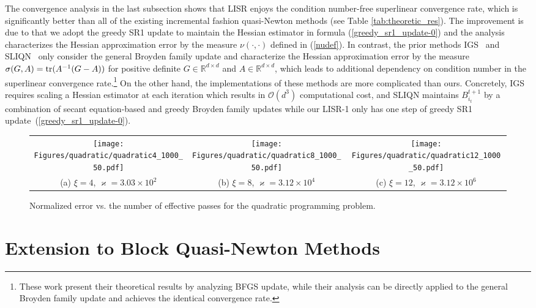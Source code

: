 \documentclass[letterpaper]{article} %
\theoremstyle{plain}
\theoremstyle{definition}
\theoremstyle{remark}
\def\BR{{\mathbb{R}}}
\def\fO{{\mathcal{O}}}
\begin{document}
The convergence analysis in the last subsection shows that LISR enjoys the condition number-free superlinear convergence rate, which is significantly better than all of the existing incremental fashion quasi-Newton methods (see Table \ref{tab:theoretic_res}).
The improvement is due to that we adopt the greedy SR1 update to maintain the Hessian estimator in formula (\ref{greedy_sr1_update-0}) and the analysis characterizes the Hessian approximation error by the measure $\nu(\cdot,\cdot)$ defined in (\ref{nudef}).
In contrast, the prior methods IGS~\cite{gao2020incremental} and SLIQN~\cite{lahoti2023sharpened} only consider the general Broyden family update and characterize the Hessian approximation error by the measure
$\sigma(G, A) = {\rm tr}(A^{-1}(G - A))$ for positive definite $G\in\BR^{d\times d}$ and $A\in\BR^{d\times d}$, which leads to additional dependency on condition number in the superlinear convergence rate.\footnote{These work present their theoretical results by analyzing BFGS update, while their analysis can be directly applied to the general Broyden family update and achieves the identical convergence rate.} 
On the other hand, the implementations of these methods are more complicated than ours. 
Concretely, IGS requires scaling a Hessian estimator at each iteration which results in $\fO(d^3)$ computational cost, and
SLIQN maintains $B_{i_t}^{t+1}$ by a combination of secant equation-based and greedy Broyden family updates while our LISR-1 only has one step of greedy SR1 update~(\ref{greedy_sr1_update-0}).

\begin{figure*}[!tb]
\centering
\begin{tabular}{ccc}
     \texttt{[image: Figures/quadratic/quadratic4\_1000\_50.pdf]}
     & \texttt{[image: Figures/quadratic/quadratic8\_1000\_50.pdf]}
     & \texttt{[image: Figures/quadratic/quadratic12\_1000\_50.pdf]} \\
     (a) $\xi = 4$, $\varkappa=3.03\times10^2$ & (b) $\xi = 8$, $\varkappa=3.12\times10^4$ & (c) $\xi = 12$, $\varkappa=3.12\times10^6$
\end{tabular}
\caption{Normalized error vs. the number of effective passes for the quadratic programming problem.}
\label{fig:quadratic_result}
\end{figure*}

\section{Extension to Block Quasi-Newton Methods}\label{sec:block_update}
\end{document}
